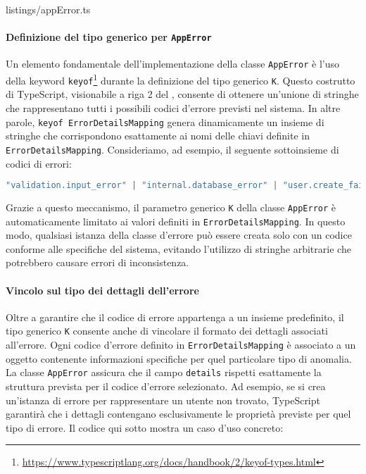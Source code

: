 
{listings/appError.ts}

\paragraph{Definizione del tipo generico per \texttt{AppError}}
Un elemento fondamentale dell'implementazione della classe \texttt{AppError} è l'uso della keyword \texttt{keyof}\footnote{\url{https://www.typescriptlang.org/docs/handbook/2/keyof-types.html}} durante la definizione del tipo generico \texttt{K}. Questo costrutto di TypeScript, visionabile a riga 2 del , consente di ottenere un'unione di stringhe che rappresentano tutti i possibili codici d'errore previsti nel sistema. In altre parole, \texttt{keyof ErrorDetailsMapping} genera dinamicamente un insieme di stringhe che corrispondono esattamente ai nomi delle chiavi definite in \texttt{ErrorDetailsMapping}.
%
Consideriamo, ad esempio, il seguente sottoinsieme di codici di errori:
\begin{lstlisting}[language=typescript, caption={Esempio di unione di stringhe generate da \texttt{keyof}}]
  "validation.input_error" | "internal.database_error" | "user.create_failed"
\end{lstlisting}
%
Grazie a questo meccanismo, il parametro generico \texttt{K} della classe \texttt{AppError} è automaticamente limitato ai valori definiti in \texttt{ErrorDetailsMapping}. In questo modo, qualsiasi istanza della classe d'errore può essere creata solo con un codice conforme alle specifiche del sistema, evitando l'utilizzo di stringhe arbitrarie che potrebbero causare errori di inconsistenza.

\paragraph{Vincolo sul tipo dei dettagli dell’errore}
Oltre a garantire che il codice di errore appartenga a un insieme predefinito, il tipo generico \texttt{K} consente anche di vincolare il formato dei dettagli associati all’errore. Ogni codice d’errore definito in \texttt{ErrorDetailsMapping} è associato a un oggetto contenente informazioni specifiche per quel particolare tipo di anomalia. La classe \texttt{AppError} assicura che il campo \texttt{details} rispetti esattamente la struttura prevista per il codice d’errore selezionato.
%
Ad esempio, se si crea un'istanza di errore per rappresentare un utente non trovato, TypeScript garantirà che i dettagli contengano esclusivamente le proprietà previste per quel tipo di errore. Il codice qui sotto mostra un caso d’uso concreto:

